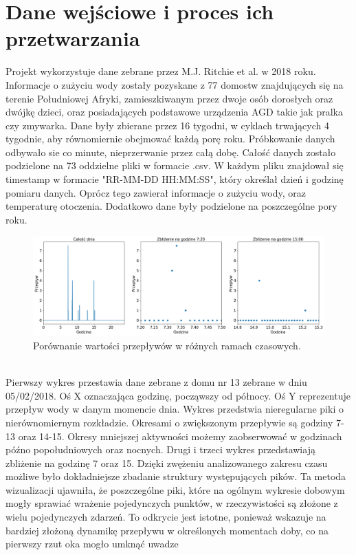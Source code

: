 \documentclass[a4paper,twoside,12pt]{book}
\begin{document}
\section{Dane wejściowe i proces ich przetwarzania}
Projekt wykorzystuje dane zebrane przez M.J. Ritchie et al.\cite{bib:artykul_dane} w 2018 roku. Informacje o zużyciu wody zostały pozyskane z 77 domostw znajdujących się na terenie Południowej Afryki, zamieszkiwanym przez dwoje osób dorosłych oraz dwójkę dzieci, oraz posiadających podstawowe urządzenia AGD takie jak pralka czy zmywarka. Dane były zbierane przez 16 tygodni, w cyklach trwających 4 tygodnie, aby równomiernie obejmować każdą porę roku. Próbkowanie danych odbywało sie co minute, nieprzerwanie przez całą dobę. Całość danych zostało podzielone na 73 oddzielne pliki w formacie .csv. W każdym pliku znajdował się timestamp w formacie "RR-MM-DD HH:MM:SS", który określał dzień i godzinę pomiaru danych. Oprócz tego zawierał informacje o zużyciu wody, oraz temperaturę otoczenia. Dodatkowo dane były podzielone na poszczególne pory roku.\\
\begin{figure}[!h]
  \centering
  \includegraphics[width=1\textwidth]{img/Dane_nowe_disp.png}
  \caption{Porównanie wartości przepływów w różnych ramach czasowych.}
  \label{fig:etykieta-rysunku}
\end{figure}\\
Pierwszy wykres przestawia dane zebrane z domu nr 13 zebrane w dniu 05/02/2018. Oś X oznaczająca godzinę, począwszy od północy. Oś Y reprezentuje przepływ wody w danym momencie dnia. Wykres przedstwia nieregularne piki o nierównomiernym rozkładzie. Okresami o zwiększonym przepływie są godziny 7-13 oraz 14-15. Okresy mniejszej aktywności możemy zaobserwować w godzinach późno popołudniowych oraz nocnych. Drugi i trzeci wykres przedstawiają zbliżenie na godzinę 7 oraz 15. Dzięki zwężeniu analizowanego zakresu czasu możliwe było dokładniejsze zbadanie struktury występujących pików. Ta metoda wizualizacji ujawniła, że poszczególne piki, które na ogólnym wykresie dobowym mogły sprawiać wrażenie pojedynczych punktów, w rzeczywistości są złożone z wielu pojedynczych zdarzeń. To odkrycie jest istotne, ponieważ wskazuje na bardziej złożoną dynamikę przepływu w określonych momentach doby, co na pierwszy rzut oka mogło umknąć uwadze\\
\end{document}
